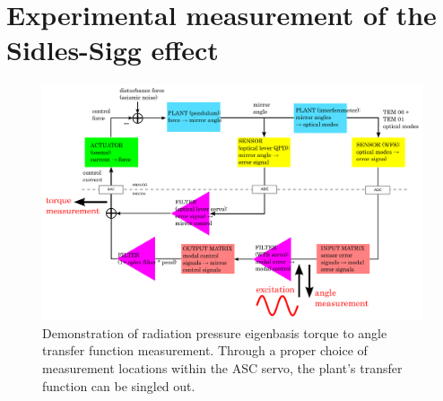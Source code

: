 





\section{Experimental measurement of the Sidles-Sigg effect}

\begin{figure}
\begin{centering}
\includegraphics[width=1.0\textwidth]{figures/ascservo_measurement.pdf}
\caption[Demonstration of radiation pressure eigenbasis torque to
  angle transfer function measurement]{Demonstration of radiation pressure eigenbasis torque to
  angle transfer function measurement. Through a proper choice of measurement
  locations within the ASC servo, the plant's transfer function can be
  singled out.}
\label{fig:RPTFmeasurement}
\end{centering}
\end{figure}

